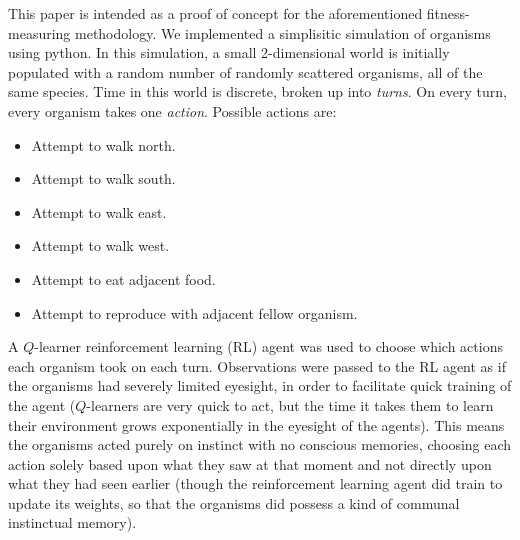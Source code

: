 \documentclass{article}
\begin{document}
This paper is intended as a proof of concept for the
aforementioned fitness-measuring methodology.
We implemented a simplisitic simulation of organisms using
python. In this simulation, a small 2-dimensional world is initially populated
with a random number of randomly scattered organisms, all of the same species.
Time in this world is discrete, broken up into \emph{turns}. On every turn,
every organism takes one \emph{action}. Possible actions are:
\begin{itemize}
    \item Attempt to walk north.
    \item Attempt to walk south.
    \item Attempt to walk east.
    \item Attempt to walk west.
    \item Attempt to eat adjacent food.
    \item Attempt to reproduce with adjacent fellow organism.
\end{itemize}
A $Q$-learner reinforcement learning (RL) agent \cite{watkins2026learning}
was used to choose which actions
each organism took on each turn.
Observations were passed to the RL agent as if the organisms
had severely limited eyesight, in order to facilitate quick training of the
agent ($Q$-learners are very quick to act, but the time it takes them to learn
their environment grows exponentially in the eyesight of the agents).
This means the organisms acted purely on instinct with no conscious memories,
choosing each action solely based upon what they saw at that moment and not
directly upon what they had seen earlier (though the reinforcement learning
agent did train to update its weights, so that the organisms did possess a
kind of communal instinctual memory).
\end{document}
